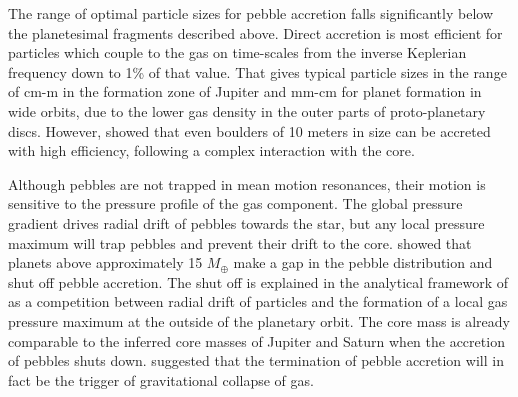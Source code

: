 The range of optimal particle sizes for pebble accretion falls significantly below the planetesimal fragments described 
above. Direct accretion is most efficient for particles which couple to the gas on time-scales from the inverse
Keplerian frequency down to 1\% of that value. That gives typical particle sizes in the range of cm-m in the formation
zone of Jupiter and mm-cm for planet formation in wide orbits, due to the lower gas density in the outer parts of 
proto-planetary discs. However, \cite{Morbidelli2012} showed that even boulders of 10 meters in size can be 
accreted with high efficiency, following a complex interaction with the core.

Although pebbles are not trapped in mean motion resonances, their motion is sensitive to the pressure profile of
the gas component. The global pressure gradient drives radial drift of pebbles towards the star, but any local pressure
maximum will trap pebbles and prevent their drift to the core. \cite{Paardekooper2006} showed that planets 
above approximately 15 $M_\oplus$ make a gap in the pebble distribution and shut off pebble accretion. The shut off is
explained in the analytical framework of \cite{Muto2009} as a competition between radial drift of particles and
the formation of a local gas pressure maximum at the outside of the planetary orbit. The core mass is already 
comparable to the inferred core masses of Jupiter and Saturn when the accretion of pebbles shuts down. \cite{Morbidelli2012} 
suggested that the termination of pebble accretion will in fact be the trigger of gravitational collapse of gas.

